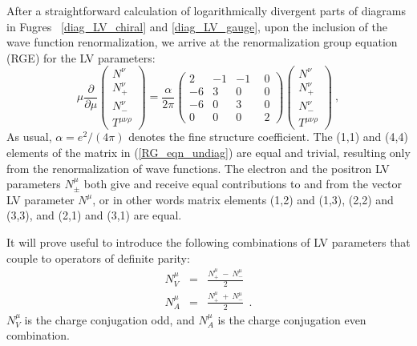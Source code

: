 \documentclass[12pt]{revtex4}
\begin{document}
After a straightforward calculation of logarithmically divergent parts of diagrams in
Fugres ~\ref{diag_LV_chiral} and \ref{diag_LV_gauge}, upon the inclusion of 
the wave function renormalization,
we arrive at the renormalization group equation (RGE) for the LV parameters:
\begin{equation}
\label{RG_eqn_undiag}
     \mu \frac{\partial}
              {\partial\mu} 
                \left(
\begin{array}{c}
                   N^\nu \\ 
   N_+^\nu \\
                   N_{-}^\nu \\
   T^{\mu\nu\rho}
                \end{array} \right) = 
     \frac{\alpha}
          {2 \pi} 
     \left(\begin{array}{rrrr}
                    2 & -1 & -1 & ~~0 \\
   -6 &  3 &  0 & ~~0 \\
                   -6 &  0 &  3 & ~~0 \\
    0 &  0 &  0 & ~~2
           \end{array}\right)
     \left(
  \begin{array}{c}
                 N^\nu \\ 
 N_+^\nu \\
                 N_{-}^\nu \\
 T^{\mu\nu\rho}
          \end{array} \right)~,
\end{equation}
As usual, $\alpha = e^2/(4\pi)$ denotes the fine structure coefficient. 
The (1,1) and (4,4) elements of the matrix in
(\ref{RG_eqn_undiag}) are equal and trivial, resulting only from the renormalization of 
wave functions. The electron and the
positron LV parameters $N_\pm^\mu$ both give and receive equal
contributions to and from the vector LV parameter $N^\mu$, or in other words 
matrix elements (1,2) and (1,3), (2,2) and (3,3), and (2,1) and (3,1) are equal. 

It will prove useful to introduce the following combinations of 
LV parameters that couple to operators of definite parity:
\begin{eqnarray}
\label{def_Nmu}
\nonumber
      N^\mu_V & = & \frac{ N_+^\mu ~-~ N_-^\mu }{2}~~  
	\\
      N^\mu_A & = & \frac{ N_+^\mu ~+~ N_-^\mu }{2}~~.
\end{eqnarray}
$N^\mu_V$ is the charge conjugation odd, and $N^\mu_A$ is the 
charge conjugation even combination. 
\end{document}
